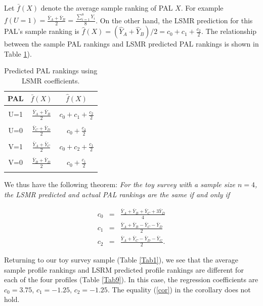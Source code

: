 \documentclass[a4paper, 12pt]{article}
\begin{document}
Let $\bar{f}(X)$ denote the average sample ranking of PAL $X$. For example $f(U=1)=\frac{\bar{Y}_A+\bar{Y}_B}{2}=\frac{\sum_{i=1}^8 Y_i}{8}$.  On the other hand, the LSMR prediction for this PAL's sample ranking is $\hat{f}(X)=(\hat{Y}_A+\hat{Y}_B)/2=c_0+c_1+\frac{c_2}{2}.$ The relationship between the sample PAL rankings and LSMR predicted PAL rankings is shown in Table \ref{LSMR}).



\begin{table}[!htpb]
	\centering
	\scriptsize
	\begin{tabular}{c|c|c}
		PAL & $\bar{f}(X)$ & $ \hat{f}(X)$ \\ \hline 
		& & \\
		U=1 & $\frac{\bar{Y}_A+\bar{Y}_B}{2}$  &$c_0+c_1+\frac{c_2}{2}$\\
			& & \\
		U=0 & $ \frac{\bar{Y}_C+\bar{Y}_D}{2}$  &$c_0+\frac{c_2}{2}$ \\
			& & \\
		V=1 &$\frac{\bar{Y}_A+\bar{Y}_C}{2}$  &$c_0+c_2+\frac{c_1}{2}$ \\
			& & \\
		V=0 & $\frac{\bar{Y}_B+\bar{Y}_D}{2}$  &$c_0+\frac{c_1}{2}$  \\
		& & \\\hline
	\end{tabular}
	\caption{{\small Predicted PAL rankings using LSMR coefficients.}}
	\label{LSMR}
\end{table}



{\flushleft We} thus have the following theorem: \emph{For the toy survey with a sample size $n=4$, the  LSMR predicted and actual PAL rankings are the same if and only if }

\begin{eqnarray}
c_0 & = & \frac{\bar{Y}_A+\bar{Y}_B+\bar{Y}_C+3\bar{Y}_D}{4}\\
c_1 & = & \frac{\bar{Y}_A+\bar{Y}_B-\bar{Y}_C-\bar{Y}_D}{2}\\
c_2 & = & \frac{\bar{Y}_A+\bar{Y}_C-\bar{Y}_D-\bar{Y}_G}{2}.
\end{eqnarray}


Returning to our toy survey sample (Table \ref{Tab1}), we see that the average sample profile rankings and LSRM predicted profile rankings are different for each of the four profiles (Table \ref{Tab9}). In this case, the regression coefficients are
$c_0=3.75$, $c_1=-1.25$, $c_2=-1.25$.  The equality (\ref{cor}) in the corollary does not hold.
\end{document}
